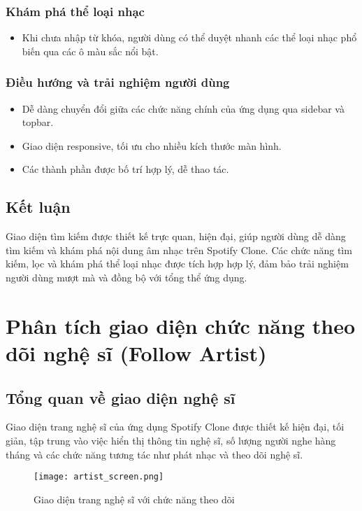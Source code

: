 \documentclass{book}
\let\oldsection\section
\renewcommand{\section}{\clearpage\oldsection}
\begin{document}
\subsubsection{Khám phá thể loại nhạc}
\begin{itemize}
    \item Khi chưa nhập từ khóa, người dùng có thể duyệt nhanh các thể loại nhạc phổ biến qua các ô màu sắc nổi bật.
\end{itemize}

\subsubsection{Điều hướng và trải nghiệm người dùng}
\begin{itemize}
    \item Dễ dàng chuyển đổi giữa các chức năng chính của ứng dụng qua sidebar và topbar.
    \item Giao diện responsive, tối ưu cho nhiều kích thước màn hình.
    \item Các thành phần được bố trí hợp lý, dễ thao tác.
\end{itemize}

\subsection{Kết luận}
Giao diện tìm kiếm được thiết kế trực quan, hiện đại, giúp người dùng dễ dàng tìm kiếm và khám phá nội dung âm nhạc trên Spotify Clone. Các chức năng tìm kiếm, lọc và khám phá thể loại nhạc được tích hợp hợp lý, đảm bảo trải nghiệm người dùng mượt mà và đồng bộ với tổng thể ứng dụng.

\section{Phân tích giao diện chức năng theo dõi nghệ sĩ (Follow Artist)}

\subsection{Tổng quan về giao diện nghệ sĩ}
Giao diện trang nghệ sĩ của ứng dụng Spotify Clone được thiết kế hiện đại, tối giản, tập trung vào việc hiển thị thông tin nghệ sĩ, số lượng người nghe hàng tháng và các chức năng tương tác như phát nhạc và theo dõi nghệ sĩ.

\begin{figure}[h!]
\centering
\texttt{[image: artist\_screen.png]} %
\caption{Giao diện trang nghệ sĩ với chức năng theo dõi}
\label{fig:artist}
\end{figure}
\end{document}
